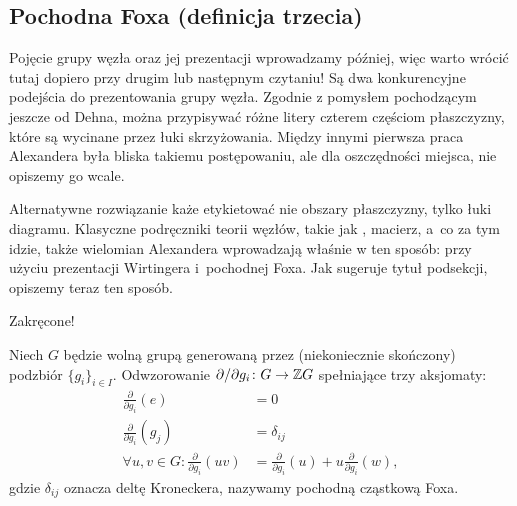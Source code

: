 
\subsection{Pochodna Foxa (definicja trzecia)}
%
Pojęcie grupy węzła oraz jej prezentacji wprowadzamy później, więc warto wrócić tutaj dopiero przy drugim lub następnym czytaniu!
Są dwa konkurencyjne podejścia do prezentowania grupy węzła.
Zgodnie z pomysłem pochodzącym jeszcze od Dehna, można przypisywać różne litery czterem częściom płaszczyzny, które są wycinane przez łuki skrzyżowania.
%
Między innymi pierwsza praca Alexandera była bliska takiemu postępowaniu, ale dla oszczędności miejsca, nie opiszemy go wcale.
%

Alternatywne rozwiązanie każe etykietować nie obszary płaszczyzny, tylko łuki diagramu.
Klasyczne podręczniki teorii węzłów, takie jak \cite{crowell63}, macierz, a~co za tym idzie, także wielomian Alexandera wprowadzają właśnie w ten sposób: przy użyciu prezentacji Wirtingera i~pochodnej Foxa.
Jak sugeruje tytuł podsekcji, opiszemy teraz ten sposób.

Zakręcone!

\begin{definition}
\label{def:fox_derivative}%
    Niech $G$ będzie wolną grupą generowaną przez (niekoniecznie skończony) podzbiór $\{g_i\}_{i \in I}$.
    Odwzorowanie $\partial/\partial g_i \colon G \to \mathbb Z G$ spełniające trzy aksjomaty:
    \begin{align}
        \frac{\partial}{\partial g_i} (e) & = 0 \\
        \frac{\partial}{\partial g_i} (g_j) & = \delta_{ij} \\
        \forall u, v \in G : \frac{\partial}{\partial g_i} (uv) & = \frac{\partial}{\partial g_i}(u) + u \frac{\partial}{\partial g_i} (w),
    \end{align}
    gdzie $\delta_{ij}$ oznacza deltę Kroneckera, nazywamy pochodną cząstkową Foxa.
\end{definition}




















